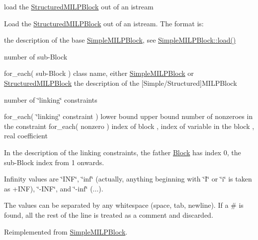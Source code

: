 load the \mbox{\hyperlink{class_s_m_spp__di__unipi__it_1_1_structured_m_i_l_p_block}{Structured\+M\+I\+L\+P\+Block}} out of an istream 

Load the \mbox{\hyperlink{class_s_m_spp__di__unipi__it_1_1_structured_m_i_l_p_block}{Structured\+M\+I\+L\+P\+Block}} out of an istream. The format is\+:

the description of the base \mbox{\hyperlink{class_s_m_spp__di__unipi__it_1_1_simple_m_i_l_p_block}{Simple\+M\+I\+L\+P\+Block}}, see \mbox{\hyperlink{class_s_m_spp__di__unipi__it_1_1_simple_m_i_l_p_block_a019850055afe817b816bae5699f461d3}{Simple\+M\+I\+L\+P\+Block\+::load()}}

number of sub-\/\+Block

for\+\_\+each( sub-\/\+Block ) class name, either \mbox{\hyperlink{class_s_m_spp__di__unipi__it_1_1_simple_m_i_l_p_block}{Simple\+M\+I\+L\+P\+Block}} or \mbox{\hyperlink{class_s_m_spp__di__unipi__it_1_1_structured_m_i_l_p_block}{Structured\+M\+I\+L\+P\+Block}} the description of the \mbox{[}Simple/\+Structured\mbox{]}M\+I\+L\+P\+Block

number of \char`\"{}linking\char`\"{} constraints

for\+\_\+each( \char`\"{}linking\char`\"{} constraint ) lower bound upper bound number of nonzeroes in the constraint for\+\_\+each( nonzero ) index of block , index of variable in the block , real coefficient

In the description of the linking constraints, the father \mbox{\hyperlink{class_s_m_spp__di__unipi__it_1_1_block}{Block}} has index 0, the sub-\/\+Block index from 1 onwards.

Infinity values are \char`\"{}\+I\+N\+F\char`\"{}, \char`\"{}inf\char`\"{} (actually, anything beginning with \char`\"{}\+I\char`\"{} or \char`\"{}i\char`\"{} is taken as +\+I\+NF), \char`\"{}-\/\+I\+N\+F\char`\"{}, and \char`\"{}-\/inf\char`\"{} (...).

The values can be separated by any whitespace (space, tab, newline). If a \textquotesingle{}\#\textquotesingle{} is found, all the rest of the line is treated as a comment and discarded. 

Reimplemented from \mbox{\hyperlink{class_s_m_spp__di__unipi__it_1_1_simple_m_i_l_p_block_a019850055afe817b816bae5699f461d3}{Simple\+M\+I\+L\+P\+Block}}.

\mbox{\label{class_s_m_spp__di__unipi__it_1_1_structured_m_i_l_p_block_aefb3f33afdab2b6f4aef3f926c10df51}} 

